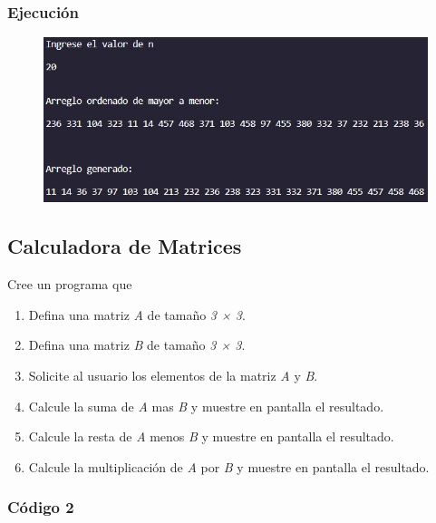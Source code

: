 \documentclass{article}
\begin{document}
\subsubsection{Ejecución}

\begin{figure}[H]
	\centering
	\includegraphics[width = 15cm]{img1.jpg}
\end{figure}
\newpage

\subsection{Calculadora de Matrices}

Cree un programa que

\begin{enumerate}
	\item Defina una matriz \textit{A} de tamaño \textit{3 × 3}.
	\item Defina una matriz \textit{B} de tamaño \textit{3 × 3}.
	\item Solicite al usuario los elementos de la matriz \textit{A} y \textit{B}.
	\item Calcule la suma de \textit{A} mas \textit{B} y muestre en pantalla el resultado.
	\item Calcule la resta de \textit{A} menos \textit{B} y muestre en pantalla el resultado.
	\item Calcule la multiplicación de \textit{A} por \textit{B} y muestre en pantalla el resultado.
\end{enumerate}

\subsubsection{Código 2}
\end{document}
